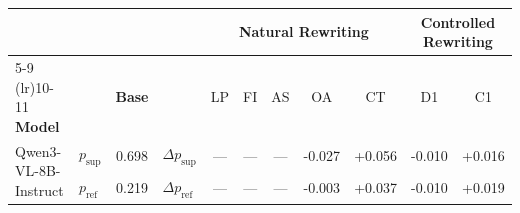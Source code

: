 \begin{tabular}{l l c l ccccccc}
\toprule
 & & & & \multicolumn{5}{c}{\textbf{Natural Rewriting}} & \multicolumn{2}{c}{\textbf{Controlled Rewriting}} \\
\cmidrule(lr){5-9} \cmidrule(lr){10-11}
\textbf{Model} & & \textbf{Base} & & LP & FI & AS & OA & CT & D1 & C1 \\
\midrule
 \multirow{2}{*}{Qwen3-VL-8B-Instruct} & $p_{\text{sup}}$ & 0.698 & $\Delta p_{\text{sup}}$ & — & — & — & \cellcolor{red!10}-0.027 & \cellcolor{green!22}+0.056 & \cellcolor{red!5}-0.010 & \cellcolor{green!6}+0.016 \\
  & $p_{\text{ref}}$ & 0.219 & $\Delta p_{\text{ref}}$ & — & — & — & \cellcolor{red!5}-0.003 & \cellcolor{green!14}+0.037 & \cellcolor{red!5}-0.010 & \cellcolor{green!7}+0.019 \\
\bottomrule
\end{tabular}